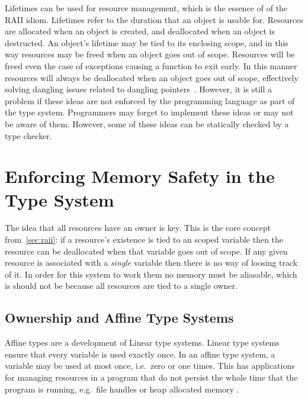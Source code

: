 Lifetimes can be used for resource management, which is the essence of of the
RAII idiom. Lifetimes refer to the duration that an object is usable for.
Resources are allocated when an object is created, and deallocated when an
object is destructed. An object's lifetime may be tied to its enclosing scope,
and in this way resources may be freed when an object goes out of scope.
Resources will be freed even the case of exceptions causing a function to exit
early. In this manner resources will always be deallocated when an object goes
out of scope, effectively solving dangling issues related to dangling
pointers~\cite{rust}. However, it is still a problem if these ideas are not
enforced by the programming language as part of the type system. Programmers
may forget to implement these ideas or may not be aware of them. However, some
of these ideas can be statically checked by a type checker.

\section{Enforcing Memory Safety in the Type System}
The idea that all resources have an owner is key. This is the core concept
from~\ref{sec:raii}: if a resource's existence is tied to an scoped variable
then the resource can be deallocated when that variable goes out of scope.  If
any given resource is associated with a \textit{single} variable then there is
no way of loosing track of it. In order for this system to work them no memory
must be aliasable, which is should not be because all resources are tied to a
single owner.

\subsection{Ownership and Affine Type Systems}
Affine types are a development of Linear type systems. Linear type systems
ensure that every variable is used exactly once. \cite{ownership} In an affine type system, a
variable may be used at most once, i.e.\ zero or one times. This has
applications for managing resources in a program that do not persist the whole
time that the program is running, e.g.\ file handles or heap allocated memory
\cite{attapl} \cite{tovAffine}.

